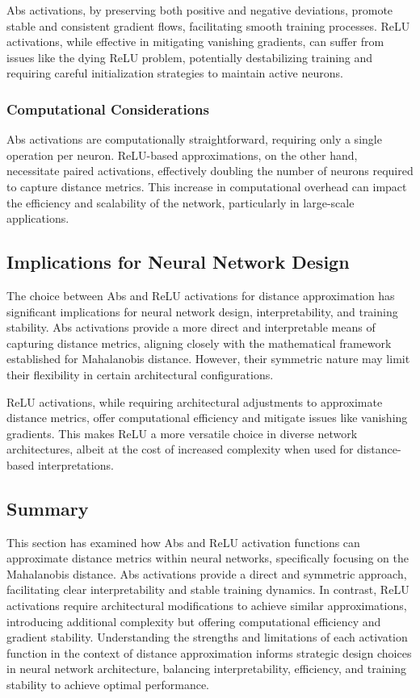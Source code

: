 Abs activations, by preserving both positive and negative deviations, promote stable and consistent gradient flows, facilitating smooth training processes. ReLU activations, while effective in mitigating vanishing gradients, can suffer from issues like the dying ReLU problem, potentially destabilizing training and requiring careful initialization strategies to maintain active neurons.

\subsubsection{Computational Considerations}

Abs activations are computationally straightforward, requiring only a single operation per neuron. ReLU-based approximations, on the other hand, necessitate paired activations, effectively doubling the number of neurons required to capture distance metrics. This increase in computational overhead can impact the efficiency and scalability of the network, particularly in large-scale applications.

\subsection{Implications for Neural Network Design}

The choice between Abs and ReLU activations for distance approximation has significant implications for neural network design, interpretability, and training stability. Abs activations provide a more direct and interpretable means of capturing distance metrics, aligning closely with the mathematical framework established for Mahalanobis distance. However, their symmetric nature may limit their flexibility in certain architectural configurations.

ReLU activations, while requiring architectural adjustments to approximate distance metrics, offer computational efficiency and mitigate issues like vanishing gradients. This makes ReLU a more versatile choice in diverse network architectures, albeit at the cost of increased complexity when used for distance-based interpretations.

\subsection{Summary}

This section has examined how Abs and ReLU activation functions can approximate distance metrics within neural networks, specifically focusing on the Mahalanobis distance. Abs activations provide a direct and symmetric approach, facilitating clear interpretability and stable training dynamics. In contrast, ReLU activations require architectural modifications to achieve similar approximations, introducing additional complexity but offering computational efficiency and gradient stability. Understanding the strengths and limitations of each activation function in the context of distance approximation informs strategic design choices in neural network architecture, balancing interpretability, efficiency, and training stability to achieve optimal performance.

